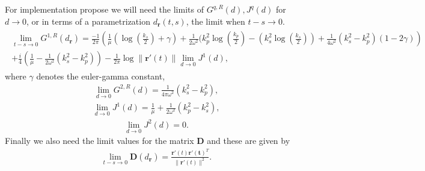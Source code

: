 \documentclass{article}
\newcommand{\br}{\bm{r}}
\begin{document}
For implementation propose we will need the limits of $G^{q,R}(d), J^q(d)$ for $d \rightarrow 0$, or in terms of a parametrization $d_{\br}(t,s)$, the limit when $t-s \rightarrow 0$.
\begin{align*}
\begin{split}
\lim_{t-s \rightarrow 0} G^{1,R}(d_{\br}) = \frac{-1}{2\pi} \left(
\frac{1}{\mu} (\log (\frac{k_s}{2})+\gamma)+ \frac{1}{2 \omega^2}(k_p^2\log(\frac{k_p}{2})-
(k_s^2\log(\frac{k_s}{2}))
+\frac{1}{4 \omega^2} (k_s^2-k_p^2)(1-2\gamma)\right)\\
+\frac{i}{4}\left(
\frac{1}{\mu}- \frac{1}{2\omega^2}(k_s^2-k_p^2)
\right)
-\frac{1}{2\pi} \log \| \mathbf{r}'(t)\| \lim_{d \rightarrow 0}J^1(d),
\end{split}
\end{align*}
where $\gamma$ denotes the euler-gamma constant,
\begin{align*}
\lim_{d \rightarrow 0} G^{2,R}(d) = \frac{1}{4\pi\omega^2}(k_s^2-k_p^2),
\end{align*}
\begin{align*}
\lim_{d \rightarrow 0} J^1(d) = \frac{1}{\mu} + \frac{1}{2\omega^2}(k_p^2-k_s^2),
\end{align*}
\begin{align*}
\lim_{d \rightarrow 0} J^2(d) = 0.
\end{align*}
Finally we also need the limit values for the matrix $\mathbf{D}$ and these are given by 
\begin{align*}
\lim_{t-s \rightarrow 0} \mathbf{D}(d_{\br}) = \frac{\mathbf{r}' (t)\mathbf{{r'}(t)}^{T}}{\| \mathbf{r}'(t)\|^2}.
\end{align*} 
\end{document}
